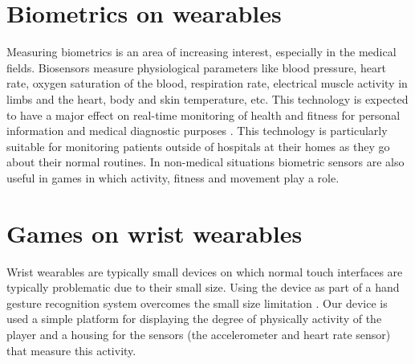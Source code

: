 \documentclass{SIGCHI2015LaTex/sigchi}
\begin{document}
\section{Biometrics on wearables}
Measuring biometrics is an area of increasing interest, especially in the medical fields. Biosensors measure physiological parameters like blood pressure, heart rate, oxygen saturation of the blood, respiration rate, electrical muscle activity in limbs and the heart, body and skin temperature, etc. This technology is expected to have a major effect on real-time monitoring of health and fitness for personal information and medical diagnostic purposes  \cite{pantelopoulos2010survey}. This technology is particularly suitable for monitoring patients outside of hospitals at their homes as they go about their normal routines. In non-medical situations biometric sensors are also useful in games in which activity, fitness and movement play a role.  

\section{Games on wrist wearables}
Wrist wearables are typically small devices on which normal touch interfaces are typically problematic due to their small size. Using the device as part of a hand gesture recognition system overcomes the small size limitation \cite{kim2007gesture}. Our device is used a simple platform for displaying the degree of physically activity of the player and a housing for the sensors (the accelerometer and heart rate sensor) that measure this activity. 
\end{document}
